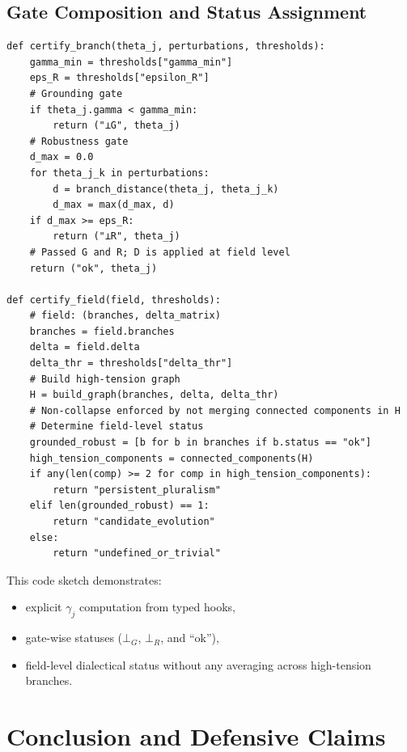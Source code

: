 \documentclass[11pt, a4paper]{article}
\begin{document}
\subsection*{Gate Composition and Status Assignment}

\begin{verbatim}
def certify_branch(theta_j, perturbations, thresholds):
    gamma_min = thresholds["gamma_min"]
    eps_R = thresholds["epsilon_R"]
    # Grounding gate
    if theta_j.gamma < gamma_min:
        return ("⊥G", theta_j)
    # Robustness gate
    d_max = 0.0
    for theta_j_k in perturbations:
        d = branch_distance(theta_j, theta_j_k)
        d_max = max(d_max, d)
    if d_max >= eps_R:
        return ("⊥R", theta_j)
    # Passed G and R; D is applied at field level
    return ("ok", theta_j)

def certify_field(field, thresholds):
    # field: (branches, delta_matrix)
    branches = field.branches
    delta = field.delta
    delta_thr = thresholds["delta_thr"]
    # Build high-tension graph
    H = build_graph(branches, delta, delta_thr)
    # Non-collapse enforced by not merging connected components in H
    # Determine field-level status
    grounded_robust = [b for b in branches if b.status == "ok"]
    high_tension_components = connected_components(H)
    if any(len(comp) >= 2 for comp in high_tension_components):
        return "persistent_pluralism"
    elif len(grounded_robust) == 1:
        return "candidate_evolution"
    else:
        return "undefined_or_trivial"
\end{verbatim}

This code sketch demonstrates:
\begin{itemize}[nosep]
  \item explicit $\gamma_j$ computation from typed hooks,
  \item gate-wise statuses ($\bot_G$, $\bot_R$, and ``ok''),
  \item field-level dialectical status without any averaging across high-tension branches.
\end{itemize}

\section{Conclusion and Defensive Claims}
\end{document}
